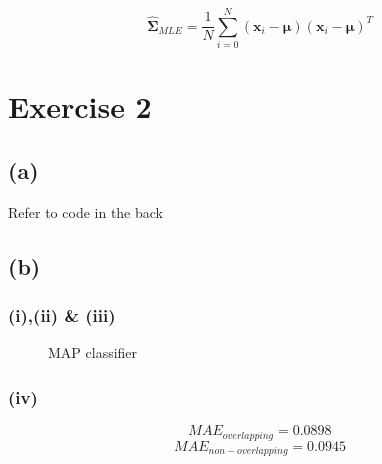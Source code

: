 \documentclass[11pt]{article}
\begin{document}
$$\hat{\pmb{\Sigma}}_{MLE}=\frac{1}{N}\sum_{i=0}^{N}(\pmb{x}_i-\pmb{\mu})(\pmb{x}_i-\pmb{\mu})^T$$

\section*{Exercise 2}
\subsection*{(a)}
\noindent Refer to code in the back
\subsection*{(b)}
\subsubsection*{(i),(ii) \& (iii)}
\begin{figure}[h]
	\centering
	\caption{MAP classifier}
\end{figure}

\subsubsection*{(iv)}
	$$MAE_{overlapping} = 0.0898$$
	$$MAE_{non-overlapping} = 0.0945$$
	
\end{document}
